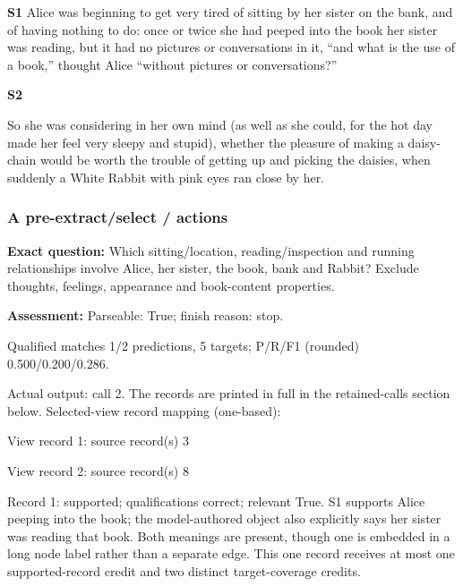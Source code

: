 \noindent\textbf{S1} Alice was beginning to get very tired of sitting by her sister on the
bank, and of having nothing to do: once or twice she had peeped into
the book her sister was reading, but it had no pictures or
conversations in it, ``and what is the use of a book,'' thought Alice
``without pictures or conversations?''\par\smallskip

\noindent\textbf{S2} 

So she was considering in her own mind (as well as she could, for the
hot day made her feel very sleepy and stupid), whether the pleasure of
making a daisy-chain would be worth the trouble of getting up and
picking the daisies, when suddenly a White Rabbit with pink eyes ran
close by her.\par\smallskip

\subsubsection*{A pre-extract/select / actions}

\noindent\textbf{Exact question:} Which sitting/location, reading/inspection and running relationships involve Alice, her sister, the book, bank and Rabbit? Exclude thoughts, feelings, appearance and book-content properties.\par

\noindent\textbf{Assessment:} Parseable: True; finish reason: stop.

Qualified matches 1/2 predictions, 5 targets; P/R/F1 (rounded) 0.500/0.200/0.286.\par

Actual output: call 2. The records are printed in full in the retained-calls section below. Selected-view record mapping (one-based):

View record 1: source record(s) 3\par

View record 2: source record(s) 8\par

\noindent Record 1: supported; qualifications correct; relevant True. S1 supports Alice peeping into the book; the model-authored object also explicitly says her sister was reading that book. Both meanings are present, though one is embedded in a long node label rather than a separate edge. This one record receives at most one supported-record credit and two distinct target-coverage credits.\par\smallskip

